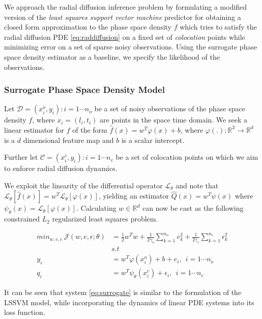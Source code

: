 \documentclass{article}
\begin{document}
We approach the radial diffusion inference problem by formulating a
modified version of the \emph{least squares support vector machine}
predictor for obtaining a closed form approximation to the phase space
density $f$ which tries to satisfy the radial diffusion PDE
\ref{eq:raddiffusion} on a fixed set of \emph{colocation} points while
minimizing error on a set of sparse noisy observations. 
Using the surrogate phase space density estimator as a baseline, we
specify the likelihood of the observations.


\subsubsection*{Surrogate Phase Space Density Model}

Let $\mathcal{D}={(x^{o}_{i}, y_{i}): i = 1 \cdots n_{o}}$ be a set of
noisy observations of the phase space density $f$, where $x_{i} =
(l_{i}, t_{i})$ are points in the space time domain. We seek a linear
estimator for $f$ of the form $\hat{f}(x) = w^{T}\varphi(x) + b$,
where $\varphi(.): \mathbb{R}^{2} \rightarrow \mathbb{R}^{d}$ is a $d$
dimensional feature map and $b$ is a scalar intercept.

Further let $\mathcal{C} ={(x^{c}_{i}, y_{i}): i = 1 \cdots n_{c}}$ be 
a set of colocation points on which we aim to enforce radial diffusion
dynamics.

We exploit the linearity of the differential operator
$\mathcal{L}_{\theta}$ and note that $\mathcal{L}_{\theta} [\hat{f}(x)]
= w^{T} \mathcal{L}_{\theta}[\varphi(x)]$, yielding an estimator
$\hat{Q}(x) = w^{T}\psi(x)$ where $\psi_{\theta}(x) =
\mathcal{L}_{\theta}[\varphi(x)]$. Calculating $w \in \mathbb{R}^d$
can now be cast as the following constrained $L_2$ regularized 
least squares problem.

\begin{align}\label{eq:surrogate}
   min_{w,e,\epsilon} \ \mathcal{J}(w,e,\epsilon;\theta) &= 
   \frac{1}{2} w^{T}w + \frac{1}{2\gamma_{o}} \sum_{k = 1}^{n_{o}}{e^{2}_{k}} + \frac{1}{2\gamma_{c}} \sum_{k = 1}^{n_{c}}{\epsilon^{2}_{k}} \\
  & s.t \nonumber \\
  y_{i} & = w^{T}\varphi(x^{o}_{i}) + b + e_{i}, \ \ i = 1 \cdots n_{o} \\
  q_{i} & = w^{T}\psi_{\theta}(x^{c}_{i}) + \epsilon_{i}, \ \ i = 1 \cdots n_{c}
\end{align}

It can be seen that system \ref{eq:surrogate} is similar to the
formulation of the LSSVM model, while incorporating the dynamics of
linear PDE systems into its loss function. 
\end{document}
